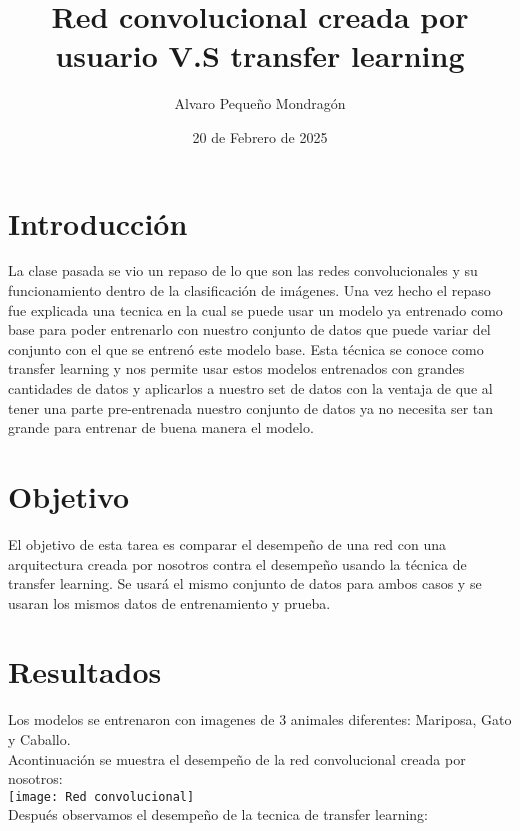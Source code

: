 \documentclass{article}
\title{\textbf{Red convolucional creada por usuario V.S transfer learning}}
\author{Alvaro Pequeño Mondragón}
\date{20 de Febrero de 2025}
\begin{document}
	
	\maketitle
	
	\section*{Introducción}
	
	La clase pasada se vio un repaso de lo que son las redes convolucionales y su funcionamiento dentro de la clasificación de imágenes. Una vez hecho el repaso fue explicada una tecnica en la cual se puede usar un modelo ya entrenado como base para poder entrenarlo con nuestro conjunto de datos que puede variar del conjunto con el que se entrenó este modelo base. Esta técnica se conoce como transfer learning y nos permite usar estos modelos entrenados con grandes cantidades de datos y aplicarlos a nuestro set de datos con la ventaja de que al tener una parte pre-entrenada nuestro conjunto de datos ya no necesita ser tan grande para entrenar de buena manera el modelo. \\
	
	\section*{Objetivo}
	
	El objetivo de esta tarea es comparar el desempeño de una red con una arquitectura creada por nosotros contra el desempeño usando la técnica de transfer learning. Se usará el mismo conjunto de datos para ambos casos y se usaran los mismos datos de entrenamiento y prueba. \\
	
	\section*{Resultados}
	
	Los modelos se entrenaron con imagenes de 3 animales diferentes: Mariposa, Gato y Caballo. \\
	
	Acontinuación se muestra el desempeño de la red convolucional creada por nosotros: \\
	
	\texttt{[image: Red convolucional]} \\
	
	Después observamos el desempeño de la tecnica de transfer learning: \\
	
\end{document}
